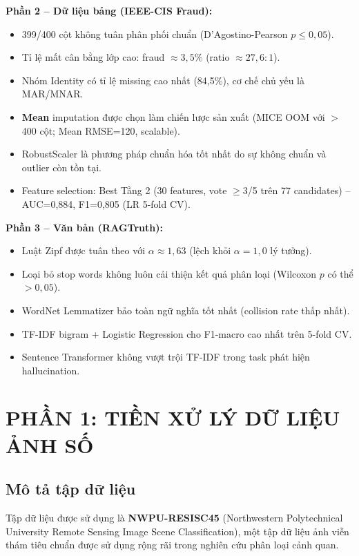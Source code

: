 \documentclass[12pt,a4paper]{article}
\let\oldtextbf\textbf
\renewcommand{\textbf}[1]{\oldtextbf{\textcolor{hcmublue}{#1}}}
\begin{document}
\textbf{Phần 2 -- Dữ liệu bảng (IEEE-CIS Fraud):}
\begin{itemize}
    \item 399/400 cột không tuân phân phối chuẩn (D'Agostino-Pearson $p \leq 0{,}05$).
    \item Tỉ lệ mất cân bằng lớp cao: fraud $\approx 3{,}5\%$ (ratio $\approx 27{,}6:1$).
    \item Nhóm Identity có tỉ lệ missing cao nhất (84,5\%), cơ chế chủ yếu là MAR/MNAR.
    \item \textbf{Mean} imputation được chọn làm chiến lược sản xuất (MICE OOM với $>$400 cột; Mean RMSE=120, scalable).
    \item RobustScaler là phương pháp chuẩn hóa tốt nhất do sự không chuẩn và outlier còn tồn tại.
    \item Feature selection: Best Tầng 2 (30 features, vote $\geq$3/5 trên 77 candidates) -- AUC=0{,}884, F1=0{,}805 (LR 5-fold CV).
\end{itemize}

\textbf{Phần 3 -- Văn bản (RAGTruth):}
\begin{itemize}
    \item Luật Zipf được tuân theo với $\alpha \approx 1{,}63$ (lệch khỏi $\alpha = 1{,}0$ lý tưởng).
    \item Loại bỏ stop words không luôn cải thiện kết quả phân loại (Wilcoxon $p$ có thể $> 0{,}05$).
    \item WordNet Lemmatizer bảo toàn ngữ nghĩa tốt nhất (collision rate thấp nhất).
    \item TF-IDF bigram + Logistic Regression cho F1-macro cao nhất trên 5-fold CV.
    \item Sentence Transformer không vượt trội TF-IDF trong task phát hiện hallucination.
\end{itemize}

\section{PHẦN 1: TIỀN XỬ LÝ DỮ LIỆU ẢNH SỐ}

\subsection{Mô tả tập dữ liệu}

Tập dữ liệu được sử dụng là \textbf{NWPU-RESISC45} (Northwestern Polytechnical University Remote Sensing Image Scene Classification), một tập dữ liệu ảnh viễn thám tiêu chuẩn được sử dụng rộng rãi trong nghiên cứu phân loại cảnh quan.
\end{document}
